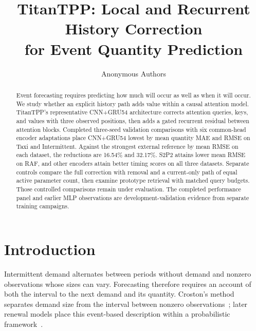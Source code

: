 \documentclass[runningheads]{llncs}
\begin{document}
\title{TitanTPP: Local and Recurrent History Correction\texorpdfstring{\\}{ }for Event Quantity Prediction}
\author{Anonymous Authors}
\maketitle

\begin{abstract}
Event forecasting requires predicting how much will occur as well as when it will occur. We study whether an explicit history path adds value within a causal attention model. TitanTPP's representative CNN+GRU54 architecture corrects attention queries, keys, and values with three observed positions, then adds a gated recurrent residual between attention blocks. Completed three-seed validation comparisons with six common-head encoder adaptations place CNN+GRU54 lowest by mean quantity MAE and RMSE on Taxi and Intermittent. Against the strongest external reference by mean RMSE on each dataset, the reductions are 16.54\% and 32.17\%. S2P2 attains lower mean RMSE on RAF, and other encoders attain better timing scores on all three datasets. Separate controls compare the full correction with removal and a current-only path of equal active parameter count, then examine prototype retrieval with matched query budgets. Those controlled comparisons remain under evaluation. The completed performance panel and earlier MLP observations are development-validation evidence from separate training campaigns.
\end{abstract}

\section{Introduction}
Intermittent demand alternates between periods without demand and nonzero observations whose sizes can vary. Forecasting therefore requires an account of both the interval to the next demand and its quantity. Croston's method separates demand size from the interval between nonzero observations~\cite{croston1972forecasting}; later renewal models place this event-based description within a probabilistic framework~\cite{turkmen2021renewal}.
\end{document}
